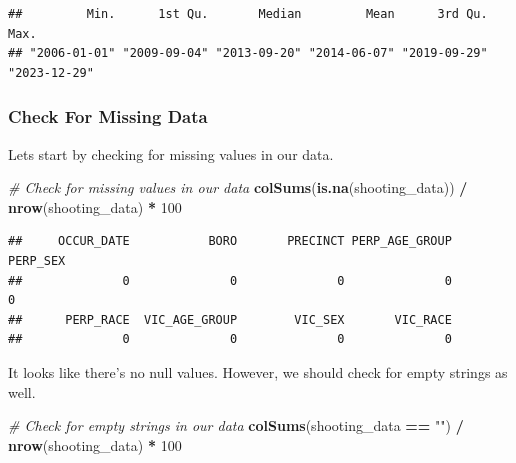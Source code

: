 \documentclass[
]{article}
\newenvironment{Shaded}{\begin{snugshade}}{\end{snugshade}}
\newcommand{\AttributeTok}[1]{\textcolor[rgb]{0.13,0.29,0.53}{#1}}
\newcommand{\CommentTok}[1]{\textcolor[rgb]{0.56,0.35,0.01}{\textit{#1}}}
\newcommand{\DecValTok}[1]{\textcolor[rgb]{0.00,0.00,0.81}{#1}}
\newcommand{\FunctionTok}[1]{\textcolor[rgb]{0.13,0.29,0.53}{\textbf{#1}}}
\newcommand{\NormalTok}[1]{#1}
\newcommand{\OtherTok}[1]{\textcolor[rgb]{0.56,0.35,0.01}{#1}}
\newcommand{\SpecialCharTok}[1]{\textcolor[rgb]{0.81,0.36,0.00}{\textbf{#1}}}
\newcommand{\StringTok}[1]{\textcolor[rgb]{0.31,0.60,0.02}{#1}}
\begin{document}
\begin{Shaded}
\end{Shaded}

\begin{verbatim}
##         Min.      1st Qu.       Median         Mean      3rd Qu.         Max. 
## "2006-01-01" "2009-09-04" "2013-09-20" "2014-06-07" "2019-09-29" "2023-12-29"
\end{verbatim}

\subsubsection{Check For Missing Data}\label{check-for-missing-data}

Lets start by checking for missing values in our data.

\begin{Shaded}
\begin{Highlighting}[]
\CommentTok{\# Check for missing values in our data}
\FunctionTok{colSums}\NormalTok{(}\FunctionTok{is.na}\NormalTok{(shooting\_data)) }\SpecialCharTok{/} \FunctionTok{nrow}\NormalTok{(shooting\_data) }\SpecialCharTok{*} \DecValTok{100}
\end{Highlighting}
\end{Shaded}

\begin{verbatim}
##     OCCUR_DATE           BORO       PRECINCT PERP_AGE_GROUP       PERP_SEX 
##              0              0              0              0              0 
##      PERP_RACE  VIC_AGE_GROUP        VIC_SEX       VIC_RACE 
##              0              0              0              0
\end{verbatim}

It looks like there's no null values. However, we should check for empty
strings as well.

\begin{Shaded}
\begin{Highlighting}[]
\CommentTok{\# Check for empty strings in our data}
\FunctionTok{colSums}\NormalTok{(shooting\_data }\SpecialCharTok{==} \StringTok{""}\NormalTok{) }\SpecialCharTok{/} \FunctionTok{nrow}\NormalTok{(shooting\_data) }\SpecialCharTok{*} \DecValTok{100}
\end{Highlighting}
\end{Shaded}
\end{document}
